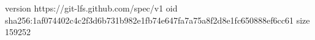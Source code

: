 version https://git-lfs.github.com/spec/v1
oid sha256:1af074402c4c2f3d6b731b982e1fb74e647fa7a75a8f2d8e1fc650888ef6cc61
size 159252
